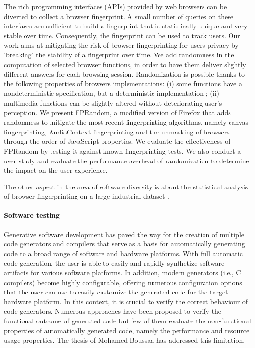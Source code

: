 The rich programming interfaces (APIs) provided by web browsers can be diverted to collect a browser fingerprint. A small number of queries on these interfaces are sufficient to build a fingerprint that is statistically unique and very stable over time. Consequently, the fingerprint can be used to track users. Our work \cite{laperdrix:hal-01527580} aims at mitigating the risk of browser fingerprinting for users privacy by 'breaking' the stability of a fingerprint over time. We add randomness in the computation of selected browser functions, in order to have them deliver slightly different answers for each browsing session. Randomization is possible thanks to the following properties of browsers implementations: (i) some functions have a nondeterministic specification, but a deterministic implementation ; (ii) multimedia functions can be slightly altered without deteriorating user's perception. We present FPRandom, a modified version of Firefox that adds randomness to mitigate the most recent fingerprinting algorithms, namely canvas fingerprinting, AudioContext fingerprinting and the unmasking of browsers through the order of JavaScript properties. We evaluate the effectiveness of FPRandom by testing it against known fingerprinting tests. We also conduct a user study and evaluate the performance overhead of randomization to determine the impact on the user experience. 

The other aspect in the area of software diversity  is about the statistical analysis of browser fingerprinting on a large industrial dataset \cite{laperdrix:tel-01621257,gomezboix:hal-01611101}. 


\paragraph{Software testing}  
Generative software development has paved the way for the creation of multiple code generators and compilers that serve as a basis for automatically generating code to a broad range of software and hardware platforms. With full automatic code generation, the user is able to easily and rapidly synthetize software artifacts for various software platforms. In addition, modern generators (i.e., C compilers) become highly configurable, offering numerous configuration options that the user can use to easily customize the generated code for the target hardware platform.
In this context, it is crucial to verify the correct behaviour of code generators. Numerous approaches have been proposed to verify the functional outcome of generated code but few of them evaluate the non-functional properties of automatically generated code, namely the performance and resource usage properties.
The thesis of Mohamed Boussaa \cite{boussaa:tel-01598821} has addressed this limitation.

